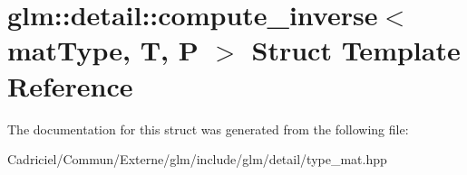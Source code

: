 \hypertarget{structglm_1_1detail_1_1compute__inverse}{}\section{glm\+:\+:detail\+:\+:compute\+\_\+inverse$<$ mat\+Type, T, P $>$ Struct Template Reference}
\label{structglm_1_1detail_1_1compute__inverse}


The documentation for this struct was generated from the following file\+:\begin{DoxyCompactItemize}
\item 
Cadriciel/\+Commun/\+Externe/glm/include/glm/detail/type\+\_\+mat.\+hpp\end{DoxyCompactItemize}
